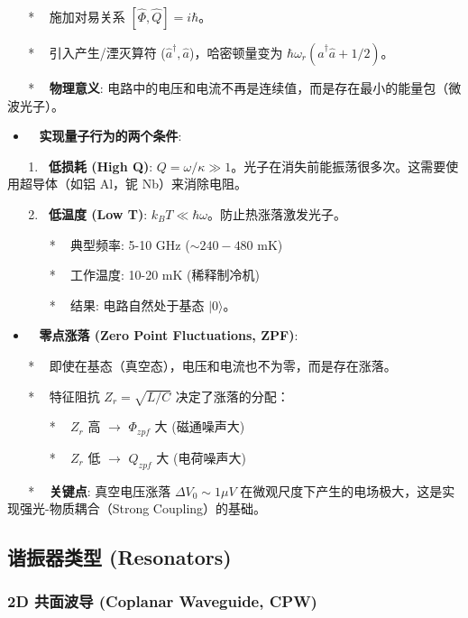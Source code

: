 \documentclass[12pt,a4paper,oneside]{ctexbook}
\providecommand{\tightlist}{%
  \setlength{\itemsep}{0pt}\setlength{\parskip}{0pt}}
\begin{document}
~ ~ * ~ 施加对易关系 \([\hat{\Phi}, \hat{Q}] = i\hbar\)。

~ ~ * ~ 引入产生/湮灭算符 (\(\hat{a}^\dagger, \hat{a}\))，哈密顿量变为
\(\hbar\omega_r(\hat{a}^\dagger\hat{a} + 1/2)\)。

~ ~ * ~ \textbf{物理意义}:
电路中的电压和电流不再是连续值，而是存在最小的能量包（微波光子）。

\begin{itemize}
\tightlist
\item
  ~ \textbf{实现量子行为的两个条件}:
\end{itemize}

~ ~ 1. ~\textbf{低损耗 (High Q)}:
\(Q = \omega/\kappa \gg 1\)。光子在消失前能振荡很多次。这需要使用超导体（如铝
Al，铌 Nb）来消除电阻。

~ ~ 2. ~\textbf{低温度 (Low T)}:
\(k_B T \ll \hbar \omega\)。防止热涨落激发光子。

~ ~ ~ ~ * ~ 典型频率: 5-10 GHz (\(\sim 240-480\) mK)

~ ~ ~ ~ * ~ 工作温度: 10-20 mK (稀释制冷机)

~ ~ ~ ~ * ~ 结果: 电路自然处于基态 \(|0\rangle\)。

\begin{itemize}
\tightlist
\item
  ~ \textbf{零点涨落 (Zero Point Fluctuations, ZPF)}:
\end{itemize}

~ ~ * ~ 即使在基态（真空态），电压和电流也不为零，而是存在涨落。

~ ~ * ~ 特征阻抗 \(Z_r = \sqrt{L/C}\) 决定了涨落的分配：

~ ~ ~ ~ * ~ \(Z_r\) 高 \(\rightarrow\) \(\Phi_{zpf}\) 大 (磁通噪声大)

~ ~ ~ ~ * ~ \(Z_r\) 低 \(\rightarrow\) \(Q_{zpf}\) 大 (电荷噪声大)

~ ~ * ~ \textbf{关键点}: 真空电压涨落 \(\Delta V_0 \sim 1 \mu V\)
在微观尺度下产生的电场极大，这是实现强光-物质耦合（Strong
Coupling）的基础。

\subsection{谐振器类型
(Resonators)}\label{ux8c10ux632fux5668ux7c7bux578b-resonators}

\subsubsection{2D 共面波导 (Coplanar Waveguide,
CPW)}\label{a.2d-ux5171ux9762ux6ce2ux5bfc-coplanar-waveguide-cpw}
\end{document}

